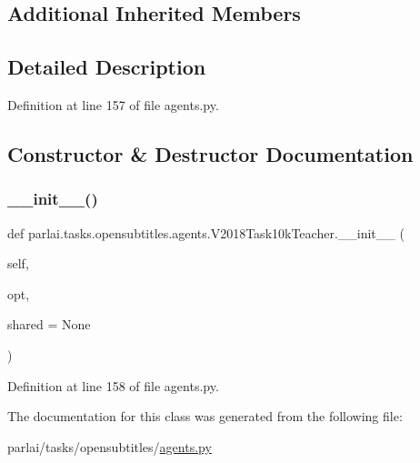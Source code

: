 \subsection*{Additional Inherited Members}


\subsection{Detailed Description}


Definition at line 157 of file agents.\+py.



\subsection{Constructor \& Destructor Documentation}
\mbox{\label{classparlai_1_1tasks_1_1opensubtitles_1_1agents_1_1V2018Task10kTeacher_af6e78685bc810f960b3d35b1dd1bf281}} 
\subsubsection{\texorpdfstring{\+\_\+\+\_\+init\+\_\+\+\_\+()}{\_\_init\_\_()}}
{\footnotesize\ttfamily def parlai.\+tasks.\+opensubtitles.\+agents.\+V2018\+Task10k\+Teacher.\+\_\+\+\_\+init\+\_\+\+\_\+ (\begin{DoxyParamCaption}\item[{}]{self,  }\item[{}]{opt,  }\item[{}]{shared = {\ttfamily None} }\end{DoxyParamCaption})}



Definition at line 158 of file agents.\+py.



The documentation for this class was generated from the following file\+:\begin{DoxyCompactItemize}
\item 
parlai/tasks/opensubtitles/\hyperlink{parlai_2tasks_2opensubtitles_2agents_8py}{agents.\+py}\end{DoxyCompactItemize}
